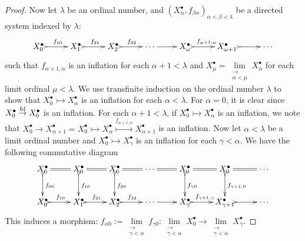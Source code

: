 \documentclass[reqno,12pt]{amsart}
\numberwithin{equation}{section}
\theoremstyle{plain}
\theoremstyle{definition}
\begin{document}
\begin{proof}
    Now let $\lambda$ be an ordinal number, and
    $(X_{\alpha}^{\bullet},f_{\beta\alpha})_{\alpha<\beta<\lambda}$ be a directed system
    indexed by $\lambda$:
    $$\xymatrix{
        X^{\bullet}_0\, \ar@{>->}[r]^{f_{10}} &
        X^{\bullet}_1\, \ar@{>->}[r]^{f_{21}} &
        X^{\bullet}_2\, \ar@{>->}[r]^{f_{32}} &
        \cdots \ar[r] &
        X^{\bullet}_{\omega}\, \ar@{>->}[r]^{f_{\omega+1,\omega}} &
        X^{\bullet}_{\omega+1}\, \ar@{>->}[r] &
        \cdots
    }$$
    such that $f_{\alpha+1,\alpha}$ is an inflation for each
    $\alpha+1<\lambda$ and $X^{\bullet}_{\mu}=
    \lim\limits_{\substack{\longrightarrow \\ \alpha<\mu}}X_{\alpha}^{\bullet}$ for each
    limit ordinal $\mu<\lambda$.
    We use transfinite induction on the ordinal number $\lambda$ to show that
    $X^{\bullet}_0\rightarrowtail X^{\bullet}_{\alpha}$ is an inflation for each
    $\alpha<\lambda$.
    For $\alpha=0$, it is clear since $X^{\bullet}_0\stackrel{\rm Id}\to X^{\bullet}_0$
    is an inflation.
    For each $\alpha+1<\lambda$, if $X^{\bullet}_0\rightarrowtail X^{\bullet}_{\alpha}$
    is an inflation, we note
    that $X^{\bullet}_0\to X^{\bullet}_{\alpha+1}=X^{\bullet}_{0}\rightarrowtail
    X^{\bullet}_{\alpha}\stackrel{f_{\alpha+1,\alpha}}\rightarrowtail
    X^{\bullet}_{\alpha+1}$ is an inflation.
    Now let $\alpha<\lambda$ be a limit ordinal number and
    $X^{\bullet}_0\rightarrowtail X^{\bullet}_{\gamma}$ is an inflation for each
    $\gamma<\alpha$. We have the following commutative diagram
    $$\xymatrix{
       X^{\bullet}_0 \ar@{>->}[d]^{f_{00}} \ar@{=}[r] & X^{\bullet}_0
       \ar@{>->}[d]^{f_{10}} \ar@{=}[r] & X^{\bullet}_0 \ar@{>->}[d]^{f_{20}} \ar@{=}[r]
       & \cdots \ar@{=}[r] & X^{\bullet}_0 \ar@{>->}[d]^{f_{\gamma 0}} \ar@{=}[r] &
       X^{\bullet}_0 \ar@{>->}[d]^{f_{\gamma+1,0}} \ar@{=}[r] & \cdots \\
       X^{\bullet}_0 \ar@{>->}[r]^{f_{10}} & X^{\bullet}_1 \ar@{>->}[r]^{f_{21}}
       & X^{\bullet}_2 \ar@{>->}[r]^{f_{32}} & \cdots \ar[r] &
       X^{\bullet}_{\gamma} \ar@{>->}[r]^{f_{\gamma+1,\gamma}} &
       X^{\bullet}_{\gamma+1} \ar@{>->}[r] & \cdots
    }$$ This induces a morphism: $f_{\alpha 0}:=
    \lim\limits_{\substack{\longrightarrow \\ \gamma<\alpha}}f_{\gamma 0}:
    \lim\limits_{\substack{\longrightarrow \\ \gamma<\alpha}}X_{0}^{\bullet}\to
    \lim\limits_{\substack{\longrightarrow \\ \gamma<\alpha}}X_{\gamma}^{\bullet}$.

\end{proof}
\end{document}
